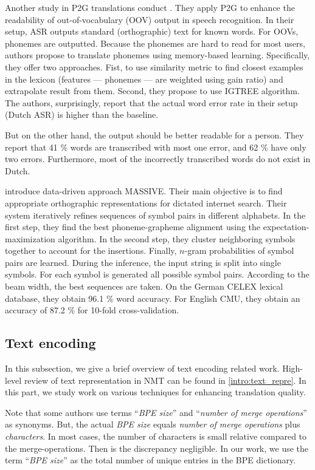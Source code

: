 Another study in P2G translations conduct . They apply P2G to enhance the readability of out-of-vocabulary (OOV) output in speech recognition. In their setup, ASR outputs standard (orthographic) text for known words. For OOVs, phonemes are outputted. Because the phonemes are hard to read for most users, authors propose to translate phonemes using memory-based learning. Specifically, they offer two approaches. Fist, to use similarity metric to find closest examples in the lexicon (features --- phonemes --- are weighted using gain ratio) and extrapolate result from them. Second, they propose to use IGTREE algorithm. The authors, surprisingly, report that the actual word error rate in their setup (Dutch ASR) is higher than the baseline.

But on the other hand, the output should be better readable for a person. They report that 41 \% words are transcribed with most one error, and 62 \% have only two errors. Furthermore, most of the incorrectly transcribed words do not exist in Dutch.

 introduce data-driven approach MASSIVE. Their main objective is to find appropriate orthographic representations for dictated internet search. Their system iteratively refines sequences of symbol pairs in different alphabets. In the first step, they find the best phoneme-grapheme alignment using the expectation-maximization algorithm. In the second step, they cluster neighboring symbols together to account for the insertions. Finally, $n$-gram probabilities of symbol pairs are learned. During the inference, the input string is split into single symbols. For each symbol is generated all possible symbol pairs. According to the beam width, the best sequences are taken. On the German CELEX lexical database, they obtain 96.1 \% word accuracy. For English CMU, they obtain an accuracy of 87.2 \% for 10-fold cross-validation.

\subsection{Text encoding}
\label{easr:re_encoding}
In this subsection, we give a brief overview of text encoding related work. High-level review of text representation in NMT can be found in \cref{intro:text_repre}. In this part, we study work on various techniques for enhancing translation quality. 

Note that some authors use terms ``\textit{BPE size}'' and ``\textit{number of merge operations}'' as synonyms. But, the actual \textit{BPE size} equals \textit{number of merge operations} plus \textit{characters}. In most cases, the number of characters is small relative compared to the merge-operations. Then is the discrepancy negligible. In our work, we use the term ``\textit{BPE size}'' as the total number of unique entries in the BPE dictionary.

